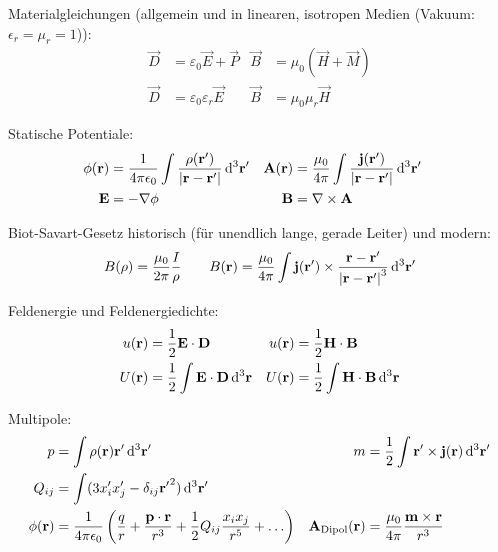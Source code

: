 Materialgleichungen (allgemein und in linearen, isotropen Medien (Vakuum: $\epsilon_r=\mu_r=1$)):
\begin{align*}
	\vec {D} & =\varepsilon _{0}\vec {E}+\vec {P}        & \vec {B} & =\mu _{0}\left(\vec {H}+\vec {M}\right) \\
	\vec {D} & =\varepsilon _{0}\varepsilon _{r}\vec {E} & \vec {B} & =\mu _{0}\mu _{r}\vec {H}
\end{align*}

Statische Potentiale:
\begin{align*}
	\phi(\vec r)   & =\frac{1}{4\pi\epsilon_0}\int \frac{\rho(\vec r')}{\left|\vec r-\vec r'\right|}\diffa[3]{\vec r'} &
	\vec A(\vec r) & =\frac{\mu_0}{4\pi}\int \frac{\vec j(\vec r')}{\left|\vec r-\vec r'\right|}\diffa[3]{\vec r'}       \\
	\vec E         & =-\nabla \phi                                                                                     &
	\vec B         & =\nabla \times\vec A                                                                              &
\end{align*}

Biot-Savart-Gesetz historisch (für unendlich lange, gerade Leiter) und modern:
\begin{align*}
	B(\rho) = \frac{\mu_0}{2\pi}\frac{I}{\rho} \qquad B(\vec r)=\frac{\mu_0}{4\pi}\int\vec j(\vec r')\times \frac{\vec r-\vec r'}{\left|\vec r-\vec r'\right|^3}\diffa[3]{\vec r'}
\end{align*}

Feldenergie und Feldenergiedichte:
\begin{align*}
	u(\vec r) & =\frac{1}{2}\vec E\cdot \vec D                      & u(\vec r) & =\frac{1}{2}\vec H\cdot \vec B                       \\
	U(\vec r) & =\frac{1}{2}\int\vec E\cdot \vec D\diffa[3]{\vec r} & U(\vec r) & =\frac{1}{2}\int\vec H\cdot \vec B \diffa[3]{\vec r}
\end{align*}


Multipole:
\begin{align*}
	p            & = \int\rho(\vec r)\vec r'\diffa[3]{\vec r'}                                                                                   & m                            & =\frac{1}{2}\int \vec r'\times\vec j(\vec r)	\diffa[3]{\vec r'} \\
	Q_{ij}       & =\int (3x_i'x_j'-\delta_{ij} {\vec r'}^2)\diffa[3]{\vec r'}                                                                   &                              &                                                                \\
	\phi(\vec r) & = \frac{1}{4\pi\epsilon_0}\left(\frac{q}{r}+\frac{\vec p\cdot \vec r}{r^3}+\frac{1}{2}Q_{ij} \frac{x_ix_j}{r^5}+\ldots\right) & \vec A_\text{Dipol} (\vec r) & =\frac{\mu_0}{4\pi} \frac{\vec m\times \vec r}{r^3}
\end{align*}

